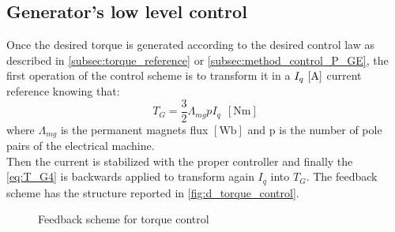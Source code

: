 \subsection{Generator's low level control}
Once the desired torque is generated according to the desired control law as described in \autoref{subsec:torque_reference} or \autoref{subsec:method_control_P_GE}, the first operation of the control scheme is to transform it in a $I_q \, \left[\si{\ampere}\right]$ current reference knowing that:
\begin{equation}
    T_G = \frac{3}{2}\Lambda_{mg} p I_q \ \ \left[\si{\newton\meter}\right]
    \label{eq:T_G4}
\end{equation}
where $\Lambda_{mg}$ is the permanent magnets flux $\left[\si{\weber}\right]$ and p is the number of pole pairs of the electrical machine.\\
Then the current is stabilized with the proper controller and finally the \autoref{eq:T_G4} is backwards applied to transform again $I_q$ into $T_G$. The feedback scheme has the structure reported in \autoref{fig:d_torque_control}.

\begin{figure}[htb]
    \centering
    
    \caption{Feedback scheme for torque control}
    \label{fig:d_torque_control}
\end{figure}

